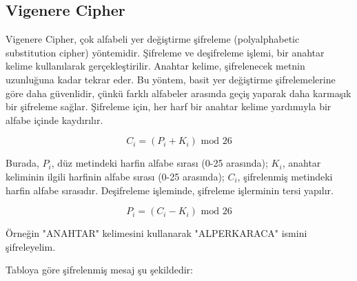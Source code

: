 \newpage

\subsection{Vigenere Cipher}

Vigenere Cipher, çok alfabeli yer değiştirme şifreleme (polyalphabetic substitution cipher) yöntemidir. Şifreleme ve deşifreleme işlemi, bir anahtar kelime kullanılarak gerçekleştirilir. Anahtar kelime, şifrelenecek metnin uzunluğuna kadar tekrar eder. Bu yöntem, basit yer değiştirme şifrelemelerine göre daha güvenlidir, çünkü farklı alfabeler arasında geçiş yaparak daha karmaşık bir şifreleme sağlar. Şifreleme için, her harf bir anahtar kelime yardımıyla bir alfabe içinde kaydırılır. 

\[ C_i = (P_i + K_i) \text{ mod } 26 \]

Burada, $P_i$, düz metindeki harfin alfabe sırası (0-25 arasında); $K_i$, anahtar keliminin ilgili harfinin alfabe sırası (0-25 arasında); $C_i$, şifrelenmiş metindeki harfin alfabe sırasıdır. Deşifreleme işleminde, şifreleme işlerminin tersi yapılır. 

\[ P_i = (C_i - K_i) \text{ mod } 26 \]

Örneğin "ANAHTAR" kelimesini kullanarak "ALPERKARACA" ismini şifreleyelim. 

\begin{table}[ht]
\centering
{}
\end{table}

Tabloya göre şifrelenmiş mesaj şu şekildedir:

